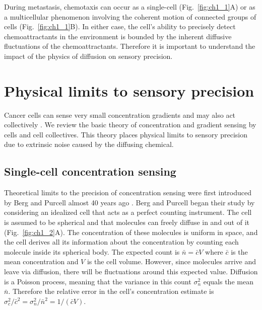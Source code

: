 During metastasis, chemotaxis can occur as a single-cell (Fig.\ \ref{fig:ch1_1}A) or as a multicellular phenomenon involving the coherent motion of connected groups of cells (Fig.\ \ref{fig:ch1_1}B). In either case, the cell's ability to precisely detect chemoattractants in the environment is bounded by the inherent diffusive fluctuations of the chemoattractants. Therefore it is important to understand the impact of the physics of diffusion on sensory precision.

\section{Physical limits to sensory precision}

Cancer cells can sense very small concentration gradients \cite{shields2007autologous} and may also act collectively
\cite{cheung2013collective, friedl2012classifying, aceto2014circulating, puliafito2015three}.
We review the basic theory of concentration and gradient sensing by cells and cell collectives. This theory places physical limits to sensory precision due to extrinsic noise caused by the diffusing chemical.

\subsection{Single-cell concentration sensing}

Theoretical limits to the precision of concentration sensing were first introduced by Berg and Purcell almost 40 years ago \cite{berg1977physics}. Berg and Purcell began their study by considering an idealized cell that acts as a perfect counting instrument. The cell is assumed to be spherical and that molecules can freely diffuse in and out of it (Fig.\ \ref{fig:ch1_2}A). The concentration of these molecules is uniform in space, and the cell derives all its information about the concentration by counting each molecule inside its spherical body. The expected count is
$\bar{n} = \bar{c}V$ where $\bar{c}$
is the mean concentration and $V$ is the cell volume. However, since molecules arrive and leave via diffusion, there will be fluctuations around this expected value. Diffusion is a Poisson process, meaning that the variance in this count $\sigma_n^2$ equals the mean $\bar{n}$. Therefore the relative error in the cell's concentration estimate is
$\sigma^2_c/\bar{c}^2 = \sigma_n^2/\bar{n}^2 = 1/(\bar{c} V)$.

